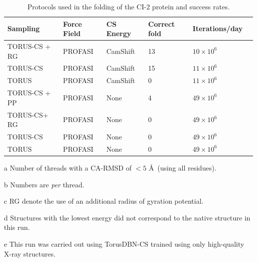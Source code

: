 \begin{table}[h]
    \caption{Protocols used in the folding of the CI-2 protein and success rates.}
    \begin{center}
    \begin{threeparttable}
    \begin{tabular}{l l l l l l}
        Sampling        & Force Field   & CS Energy         & Correct fold\tnote{a} & Iterations/day\tnote{b}\\\hline
          TORUS-CS + RG\tnote{c} & PROFASI       & CamShift          & 13            & $10 \times 10^6$ \\
          TORUS-CS      & PROFASI       & CamShift          & 15            & $11 \times 10^6$\\
          TORUS         & PROFASI       & CamShift          & 0             & $11 \times 10^6$\\
 TORUS-CS + PP\tnote{c} & PROFASI       & None              & 4\tnote{d}      & $49 \times 10^6$\\
 TORUS-CS\tnote{e}+ RG\tnote{c} & PROFASI      & None              & 0             & $49 \times 10^6$\\
          TORUS-CS      & PROFASI       & None              & 0             & $49 \times 10^6$\\
          TORUS         & PROFASI       & None              & 0             & $49 \times 10^6$\\
    \end{tabular}
    \begin{tablenotes}
        \item[a] Number of threads with a CA-RMSD of $<5$ \AA\ (using all residues).\\
        \item[b] Numbers are \textit{per} thread.\\
        \item[c] RG denote the use of an additional radius of gyration potential.\\
        \item[d] Structures with the lowest energy did not correspond to the native structure in this run.\\
        \item[e] This run was carried out using TorusDBN-CS trained using only high-quality X-ray structures.
    \end{tablenotes}
    \end{threeparttable}
    \end{center}
    \label{tab:ci2}
\end{table}
